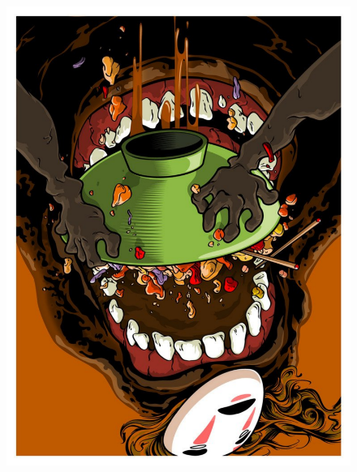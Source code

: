 \documentclass[12pt, a4paper]{article}
\begin{document}
\begin{figure}
\begin{minipage}[h!]{0.3\linewidth}
\includegraphics[width=1\textwidth, height = 0.32\textheight, angle=180]{pop6}
\end{minipage}
\end{figure}
\end{document}
